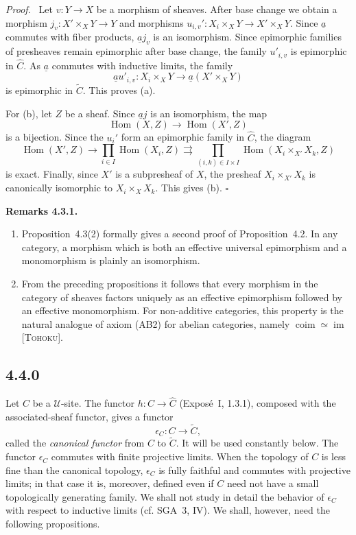 \documentclass[11pt]{article}
\newcommand{\U}{\mathcal{U}}
\newcommand{\Hom}{\operatorname{Hom}}
\newcommand{\qedtext}{\hfill\(\square\)}
\newenvironment{remarktext}[1]{\par\medskip\noindent\textbf{#1.}\ }{\par\medskip}
\newenvironment{prooftext}{\par\noindent\emph{Proof.}\ }{\par\medskip}
\begin{document}
\begin{prooftext}
Let \(v:Y\to X\) be a morphism of sheaves. After base change we obtain a morphism \(j_v:X'\times_XY\to Y\) and morphisms \(u_{i,v}':X_i\times_XY\to X'\times_XY\). Since \(\underline a\) commutes with fiber products, \(\underline a j_v\) is an isomorphism. Since epimorphic families of presheaves remain epimorphic after base change, the family \(u'_{i,v}\) is epimorphic in \(\widehat C\). As \(\underline a\) commutes with inductive limits, the family
\[
\underline a u'_{i,v}:X_i\times_XY\to \underline a(X'\times_XY)
\]
is epimorphic in \(\widetilde C\). This proves (a).

For (b), let \(Z\) be a sheaf. Since \(\underline a j\) is an isomorphism, the map
\[
\Hom(X,Z)\longrightarrow \Hom(X',Z)
\]
is a bijection. Since the \(u_i'\) form an epimorphic family in \(\widehat C\), the diagram
\[
\Hom(X',Z)\longrightarrow \prod_{i\in I}\Hom(X_i,Z)
\rightrightarrows \prod_{(i,k)\in I\times I}\Hom(X_i\times_{X'}X_k,Z)
\]
is exact. Finally, since \(X'\) is a subpresheaf of \(X\), the presheaf \(X_i\times_{X'}X_k\) is canonically isomorphic to \(X_i\times_XX_k\). This gives (b). \qedtext
\end{prooftext}

\begin{remarktext}{Remarks 4.3.1}
\begin{enumerate}[label=\arabic*)]
\item Proposition~4.3(2) formally gives a second proof of Proposition~4.2. In any category, a morphism which is both an effective universal epimorphism and a monomorphism is plainly an isomorphism.

\item From the preceding propositions it follows that every morphism in the category of sheaves factors uniquely as an effective epimorphism followed by an effective monomorphism. For non-additive categories, this property is the natural analogue of axiom (AB2) for abelian categories, namely \(\operatorname{coim}\simeq\operatorname{im}\) [\textsc{Tohoku}].
\end{enumerate}
\end{remarktext}

\subsection*{4.4.0}
Let \(C\) be a \(\U\)-site. The functor \(h:C\to \widehat C\) (Expos\'e~I, 1.3.1), composed with the associated-sheaf functor, gives a functor
\[
\epsilon_C:C\longrightarrow \widetilde C,
\]
called the \emph{canonical functor} from \(C\) to \(\widetilde C\). It will be used constantly below. The functor \(\epsilon_C\) commutes with finite projective limits. When the topology of \(C\) is less fine than the canonical topology, \(\epsilon_C\) is fully faithful and commutes with projective limits; in that case it is, moreover, defined even if \(C\) need not have a small topologically generating family. We shall not study in detail the behavior of \(\epsilon_C\) with respect to inductive limits (cf. SGA~3, IV). We shall, however, need the following propositions.
\end{document}
